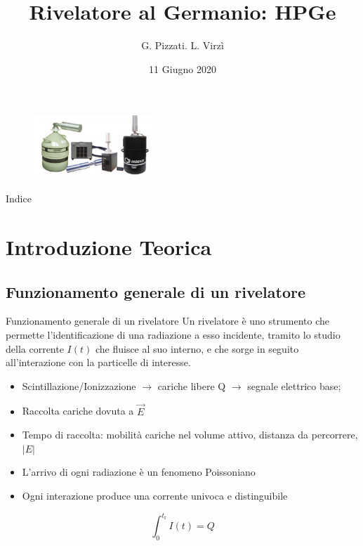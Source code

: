 \documentclass{beamer}
\title{Rivelatore al Germanio: HPGe}
\author[Pizzati e Virzì]{G. Pizzati. L. Virzì}
\institute[Bicocca]{Università degli Studi di Milano Bicocca}
\date{11 Giugno 2020}
\begin{document}
\begin{frame}
  \titlepage
  \begin{figure}
      \centering
      \includegraphics[width=0.4\textwidth]{images/copertina.png}
  \end{figure}
\end{frame}


\begin{frame}{Indice}
  \tableofcontents
\end{frame}

\section{Introduzione Teorica}

\subsection{Funzionamento generale di un rivelatore}
\begin{frame}{Funzionamento generale di un rivelatore}
    Un rivelatore è uno strumento che permette l'identificazione di una radiazione a esso incidente, tramito lo studio della corrente $I(t)$ che fluisce al suo interno, e che sorge in seguito all'interazione con la particelle di interesse.
    \begin{itemize}
        \item Scintillazione/Ionizzazione $\to$ cariche libere Q $\to$ segnale elettrico base;
        \item Raccolta cariche dovuta a $\overrightarrow{E}$
        \item Tempo di raccolta: mobilità cariche nel volume attivo, distanza da percorrere, $|E|$
        \item L'arrivo di ogni radiazione è un fenomeno Poissoniano
        \item Ogni interazione produce una corrente univoca e distinguibile
    \end{itemize}
    \begin{equation*}
        \int_{0}^{t_{\textrm{r}}}{I(t)} = Q
    \end{equation*}
\end{frame}
\end{document}

